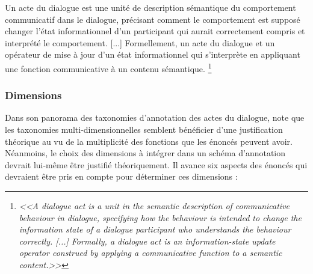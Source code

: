 \documentclass[10pt,a4paper,twoside]{article}
\begin{document}
\begin{displayquote}
Un acte du dialogue est une unité de description sémantique du comportement communicatif dans le dialogue, précisant comment le comportement est supposé changer l'état informationnel d'un participant qui aurait correctement compris et interprété le comportement. [...] Formellement, un acte du dialogue et un opérateur de mise à jour d'un état informationnel qui s’interprète en appliquant une fonction communicative à un contenu sémantique. \footnote{\textit{<<A dialogue act is a unit in the semantic description of communicative behaviour in dialogue, specifying how the behaviour is intended to change the information state of a dialogue participant who understands the behaviour correctly. [...] Formally, a dialogue act is an information-state update operator construed by applying a communicative function to a semantic content.>>}}
\end{displayquote}

\subsubsection{Dimensions}

Dans son panorama des taxonomies d'annotation des actes du dialogue, \citet{popescu2005dialogue} note que les taxonomies multi-dimensionnelles semblent bénéficier d'une justification théorique au vu de la multiplicité des fonctions que les énoncés peuvent avoir. Néanmoins, le choix des dimensions à intégrer dans un schéma d'annotation devrait lui-même être justifié théoriquement. Il avance six aspects des énoncés qui devraient être pris en compte pour déterminer ces dimensions :
\end{document}
